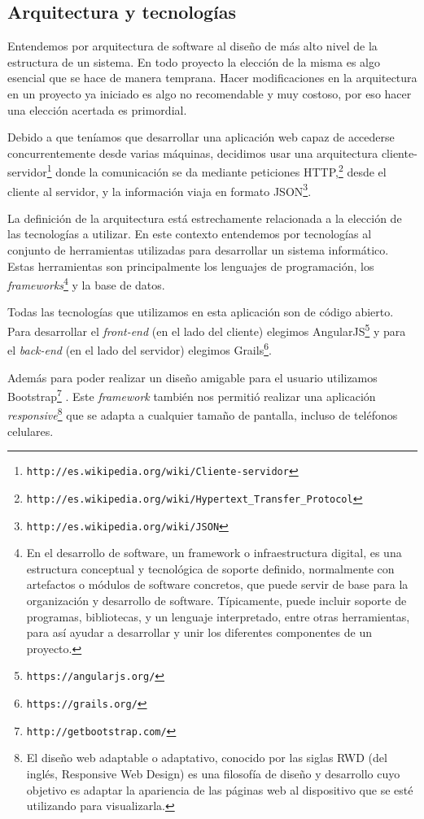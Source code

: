 \subsection{Arquitectura y tecnologías}\label{cap:arquitectura_tecnologias}
Entendemos por arquitectura de software al diseño de más alto nivel de la estructura de un sistema. En todo proyecto la elección de la misma es algo esencial que se hace de manera temprana. Hacer modificaciones en la arquitectura en un proyecto ya iniciado es algo no recomendable y muy costoso, por eso hacer una elección acertada es primordial.

Debido a que teníamos que desarrollar una aplicación web capaz de accederse concurrentemente desde varias máquinas, decidimos usar una arquitectura cliente-servidor\footnote{\texttt{http://es.wikipedia.org/wiki/Cliente-servidor}} donde la comunicación se da mediante peticiones HTTP,\footnote{\texttt{http://es.wikipedia.org/wiki/Hypertext\_Transfer\_Protocol}} desde el cliente al servidor, y la información viaja en formato JSON\footnote{\texttt{http://es.wikipedia.org/wiki/JSON}}.

La definición de la arquitectura está estrechamente relacionada a la elección de las tecnologías a utilizar. En este contexto entendemos por tecnologías al conjunto de herramientas utilizadas para desarrollar un sistema informático. Estas herramientas son principalmente los lenguajes de programación, los \textit{frameworks}\footnote{En el desarrollo de software, un framework o infraestructura digital, es una estructura conceptual y tecnológica de soporte definido, normalmente con artefactos o módulos de software concretos, que puede servir de base para la organización y desarrollo de software. Típicamente, puede incluir soporte de programas, bibliotecas, y un lenguaje interpretado, entre otras herramientas, para así ayudar a desarrollar y unir los diferentes componentes de un proyecto.} y la base de datos.

Todas las tecnologías que utilizamos en esta aplicación son de código abierto. Para desarrollar el \textit{front-end} (en el lado del cliente) elegimos AngularJS\footnote{\texttt{https://angularjs.org/}} y para el \textit{back-end} (en el lado del servidor) elegimos Grails\footnote{\texttt{https://grails.org/}}.

Además para poder realizar un diseño amigable para el usuario utilizamos Bootstrap\footnote{\texttt{http://getbootstrap.com/}} . Este \textit{framework} también nos permitió realizar una aplicación \textit{responsive}\footnote{El diseño web adaptable o adaptativo, conocido por las siglas RWD (del inglés, Responsive Web Design) es una filosofía de diseño y desarrollo cuyo objetivo es adaptar la apariencia de las páginas web al dispositivo que se esté utilizando para visualizarla.} que se adapta a cualquier tamaño de pantalla, incluso de teléfonos celulares.

